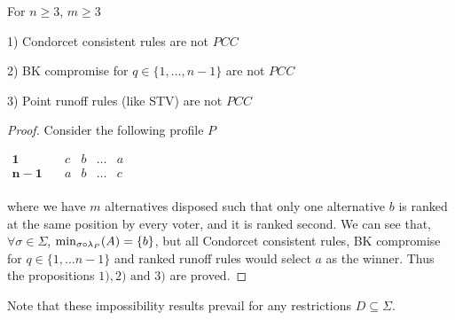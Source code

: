 \documentclass[version=3.21, pagesize, twoside=off, bibliography=totoc, DIV=calc, fontsize=12pt, a4paper]{scrartcl}
\begin{document}
\begin{proposition} For $n\geq3$, $m\geq3$  \label{prop:rulesnotPCC}
	\begin{item}
		\item[1)] Condorcet consistent rules are not $PCC$
		\item[2)] BK compromise for $q \in \{1, \dots ,n-1\}$ are not $PCC$
		\item[3)] Point runoff rules (like STV) are not $PCC$
	\end{item}
\end{proposition}
\begin{proof}
	Consider the following profile $P$
	\begin{center}
		$
		\begin{array}{ccccc}
		\mathbf{1} \quad &c&b&\dots &a\\
		\mathbf{n-1} \quad &a&b&\dots &c\\		
		\end{array}
		$
	\end{center}
	where we have $m$ alternatives disposed such that only one alternative $b$ is ranked at the same position by every voter, and it is ranked second.
	We can see that, $\forall \sigma \in \Sigma$, $\musigma=\{b\}$, but all Condorcet consistent rules, BK compromise for $q \in \{1, \dots n-1\}$ and ranked runoff rules would select $a$ as the winner. Thus the propositions $1), 2) \text{ and } 3)$ are proved. 
\end{proof}

\noindent Note that these impossibility results prevail for any restrictions $D \subseteq \Sigma$. 
\end{document}
